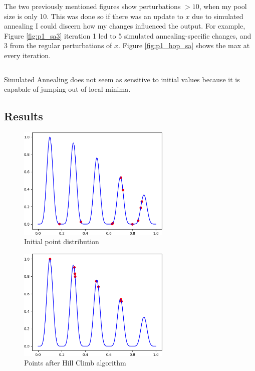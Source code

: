 \documentclass[12pt]{article}
\begin{document}
$$$$

The two previously mentioned figures show perturbations $>10$, when my pool size 
is only 10. This was done so if there was an update to $x$ due to simulated 
annealing I could discern how my changes influenced the output. For example, 
Figure \ref{fig:p1_sa3} iteration 1 led to 5 simulated annealing-specific 
changes, and 3 from the regular perturbations of $x$. Figure \ref{fig:p1_hop_sa} 
shows the max at every iteration.

$$$$

Simulated Annealing does not seem as sensitive to initial values because it is 
capabale of jumping out of local minima.

\newpage
\subsection{Results}

\begin{figure}[H]
\centering
\noindent\includegraphics[width=0.65\textwidth]{images/p1_initial_hc}
\caption{Initial point distribution}
\label{fig:p1_initial}
\end{figure}

\newpage
\begin{figure}[H]
\centering
\noindent\includegraphics[width=0.65\textwidth]{images/p1_final_hc}
\caption{Points after Hill Climb algorithm}
\label{fig:p1_final}
\end{figure}
\end{document}
